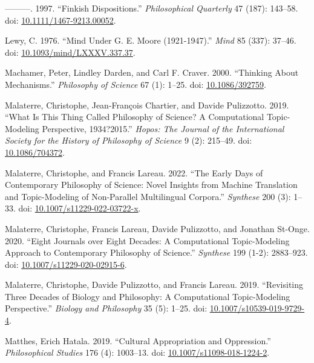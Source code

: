 \documentclass[
  11pt,
  letterpaper,
  DIV=11,
  numbers=noendperiod,
  twoside]{scrartcl}
\newlength{\cslhangindent}
\newenvironment{CSLReferences}[2] %
 {\begin{list}{}{%
  \setlength{\itemindent}{0pt}
  \setlength{\leftmargin}{0pt}
  \setlength{\parsep}{0pt}
  \ifodd #1
   \setlength{\leftmargin}{\cslhangindent}
   \setlength{\itemindent}{-1\cslhangindent}
  \fi
  \setlength{\itemsep}{#2\baselineskip}}}
 {\end{list}}
\begin{document}
\begin{CSLReferences}{1}{0}
---------. 1997. {``Finkish Dispositions.''} \emph{Philosophical
Quarterly} 47 (187): 143--58. doi:
\href{https://doi.org/10.1111/1467-9213.00052}{10.1111/1467-9213.00052}.

Lewy, C. 1976. {``Mind Under {G. E. Moore} (1921-1947).''} \emph{Mind}
85 (337): 37--46. doi:
\href{https://doi.org/10.1093/mind/LXXXV.337.37}{10.1093/mind/LXXXV.337.37}.

Machamer, Peter, Lindley Darden, and Carl F. Craver. 2000. {``Thinking
About Mechanisms.''} \emph{Philosophy of Science} 67 (1): 1--25. doi:
\href{https://doi.org/10.1086/392759}{10.1086/392759}.

Malaterre, Christophe, Jean-François Chartier, and Davide Pulizzotto.
2019. {``What Is This Thing Called Philosophy of Science? A
Computational Topic-Modeling Perspective, 1934?2015.''} \emph{Hopos: The
Journal of the International Society for the History of Philosophy of
Science} 9 (2): 215--49. doi:
\href{https://doi.org/10.1086/704372}{10.1086/704372}.

Malaterre, Christophe, and Francis Lareau. 2022. {``The Early Days of
Contemporary Philosophy of Science: Novel Insights from Machine
Translation and Topic-Modeling of Non-Parallel Multilingual Corpora.''}
\emph{Synthese} 200 (3): 1--33. doi:
\href{https://doi.org/10.1007/s11229-022-03722-x}{10.1007/s11229-022-03722-x}.

Malaterre, Christophe, Francis Lareau, Davide Pulizzotto, and Jonathan
St-Onge. 2020. {``Eight Journals over Eight Decades: A Computational
Topic-Modeling Approach to Contemporary Philosophy of Science.''}
\emph{Synthese} 199 (1-2): 2883--923. doi:
\href{https://doi.org/10.1007/s11229-020-02915-6}{10.1007/s11229-020-02915-6}.

Malaterre, Christophe, Davide Pulizzotto, and Francis Lareau. 2019.
{``Revisiting Three Decades of Biology and Philosophy: A Computational
Topic-Modeling Perspective.''} \emph{Biology and Philosophy} 35 (5):
1--25. doi:
\href{https://doi.org/10.1007/s10539-019-9729-4}{10.1007/s10539-019-9729-4}.

Matthes, Erich Hatala. 2019. {``Cultural Appropriation and
Oppression.''} \emph{Philosophical Studies} 176 (4): 1003--13. doi:
\href{https://doi.org/10.1007/s11098-018-1224-2}{10.1007/s11098-018-1224-2}.


\end{CSLReferences}
\end{document}
